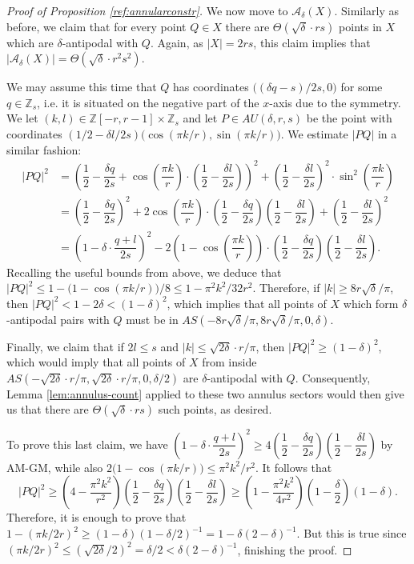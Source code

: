\documentclass[10pt,a4paper]{amsart}
\begin{document}
\begin{proof}[Proof of Proposition \ref{ref:annularconstr}]
We now move to $\mathcal{A}_\delta(X)$. Similarly as before, we claim that for every point $Q\in X$ there are $\Theta\left(\sqrt{\delta}\cdot rs\right)$ points in $X$ which are $\delta$-antipodal with $Q$. Again, as $|X|=2rs$, this claim implies that $|\mathcal{A}_\delta(X)|=\Theta\left(\sqrt{\delta}\cdot r^2s^2\right)$.

We may assume this time that $Q$ has coordinates $\big((\delta q-s)/2s,0\big)$ for some $q\in \mathbb{Z}_s$, i.e. it is situated on the negative part of the $x$-axis due to the symmetry. We let $(k,l)\in \mathbb{Z}[-r,r-1]\times \mathbb{Z}_s$ and let $P\in AU(\delta,r,s)$ be the point with coordinates
$(1/2-\delta l/2s)\big(\cos(\pi k/r),\sin(\pi k/r)\big)$. We estimate $|PQ|$ in a similar fashion: 
 \begin{align*}
        |PQ|^2 &= \left(\dfrac{1}{2}-\dfrac{\delta q}{2s}+\cos\left(\dfrac{\pi k}{r}\right)\cdot \left(\dfrac{1}{2}-\dfrac{\delta l}{2s}\right)\right)^2 +\left(\dfrac{1}{2}-\dfrac{\delta l}{2s}\right)^2\cdot \sin^2\left(\dfrac{\pi k}{r}\right) \\
         &=  \left(\dfrac{1}{2}-\dfrac{\delta q}{2s}\right)^2 + 2\cos\left(\dfrac{\pi k}{r}\right)\cdot \left(\dfrac{1}{2}-\dfrac{\delta q}{2s}\right)\left(\dfrac{1}{2}-\dfrac{\delta l}{2s}\right) + \left(\dfrac{1}{2}-\dfrac{\delta l}{2s}\right)^2\\
         &= \left(1-\delta\cdot \dfrac{q+l}{2s}\right)^2  - 2\left(1-\cos\left(\dfrac{\pi k}{r}\right)\right)\cdot \left(\dfrac{1}{2}-\dfrac{\delta q}{2s}\right)\left(\dfrac{1}{2}-\dfrac{\delta l}{2s}\right).
    \end{align*}
  \indent Recalling the useful bounds from above, we deduce that $|PQ|^2\leq 1-\big(1-\cos(\pi k/r)\big)/8\leq 1-\pi^2k^2/32r^2$. Therefore, if $|k|\geq 8r\sqrt{\delta}/\pi$, then $|PQ|^2< 1-2\delta<(1-\delta)^2$, which implies that all points of $X$ which form $\delta$-antipodal pairs with $Q$ must be in $AS(-8r\sqrt{\delta}/\pi,8r\sqrt{\delta}/\pi,0,\delta)$.  

 Finally, we claim that if $2l\leq s$ and $|k|\leq \sqrt{2\delta}\cdot r/\pi$, then $|PQ|^2\geq (1-\delta)^2$, which would imply that all points of $X$ from inside $AS(-\sqrt{2\delta}\cdot r/\pi,\sqrt{2\delta}\cdot r/\pi,0,\delta/2)$ are $\delta$-antipodal with $Q$. Consequently, Lemma \ref{lem:annulus-count} applied to these two annulus sectors would then give us that there are $\Theta\left(\sqrt{\delta}\cdot rs\right)$ such points, as desired.

 To prove this last claim, we have $\left(1-\delta\cdot \dfrac{q+l}{2s}\right)^2\ge 4\left(\dfrac{1}{2}-\dfrac{\delta q}{2s}\right)\left(\dfrac{1}{2}-\dfrac{\delta l}{2s}\right)$ by AM-GM,
 while also $2\big(1-\cos(\pi k/r)\big)\leq \pi^2k^2/r^2$. It follows that
 $$|PQ|^2\geq \left(4-\dfrac{\pi^2k^2}{r^2}\right)\left(\dfrac{1}{2}-\dfrac{\delta q}{2s}\right)\left(\dfrac{1}{2}-\dfrac{\delta l}{2s}\right)\geq \left(1-\dfrac{\pi^2k^2}{4r^2}\right)\left(1-\dfrac{\delta}{2}\right)(1-\delta).$$
  Therefore, it is enough to prove that $1-(\pi k/2r)^2\geq (1-\delta)(1-\delta/2)^{-1}=1-\delta(2-\delta)^{-1}$. But this is true since $(\pi k/2r)^2\leq (\sqrt{2\delta}/2)^2=\delta/2<\delta(2-\delta)^{-1}$, finishing the proof.
\end{proof}
\end{document}

